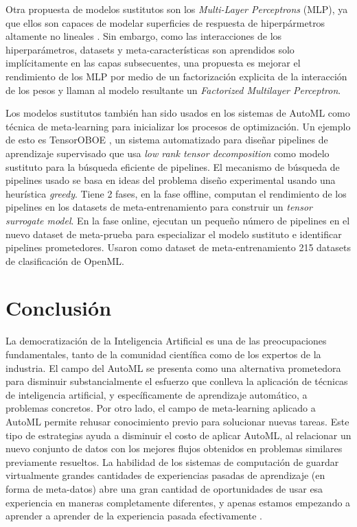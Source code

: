 Otra propuesta de modelos sustitutos son los \textit{Multi-Layer Perceptrons} (MLP), ya que ellos son capaces de modelar superficies de respuesta de hiperpármetros altamente no lineales \cite{schilling2015hyp}. Sin embargo, como las interacciones de los hiperparámetros, datasets y meta-características son aprendidos solo implícitamente en las capas subsecuentes, una propuesta es mejorar el rendimiento de los MLP por medio de un factorización explicita de la interacción de los pesos y llaman al modelo resultante un \textit{Factorized Multilayer Perceptron}.

Los modelos sustitutos también han sido usados en los sistemas de AutoML como técnica de meta-learning para inicializar los procesos de optimización. Un ejemplo de esto es TensorOBOE \cite{yang2020automl}, un sistema automatizado para diseñar pipelines de aprendizaje supervisado que usa \textit{low rank tensor decomposition} como modelo sustituto para la búsqueda eficiente de pipelines. El mecanismo de búsqueda de pipelines usado se basa en ideas del problema diseño experimental \cite{borkowski1994optimal, makar2011teaching} usando una heurística \textit{greedy}. Tiene 2 fases, en la fase offline, computan el rendimiento de los pipelines en los datasets de meta-entrenamiento para construir un \textit{tensor surrogate model}. En la fase online, ejecutan un pequeño número de pipelines en el nuevo dataset de meta-prueba para especializar el modelo sustituto e identificar pipelines prometedores. Usaron como dataset de meta-entrenamiento 215 datasets de clasificación de OpenML.


\section{Conclusión}\label{sec:conclusion}

La democratización de la Inteligencia Artificial es una de las preocupaciones fundamentales, tanto de la comunidad científica como de los expertos de la industria. El campo del AutoML se presenta como una alternativa prometedora para disminuir substancialmente el esfuerzo que conlleva la aplicación de técnicas de inteligencia artificial, y específicamente de aprendizaje automático, a problemas concretos. Por otro lado, el campo de meta-learning aplicado a AutoML permite rehusar conocimiento previo para solucionar nuevas tareas. Este tipo de estrategias ayuda a disminuir el costo de aplicar AutoML, al relacionar un nuevo conjunto de datos con los mejores flujos obtenidos en problemas similares previamente resueltos. La habilidad de los sistemas de computación de guardar virtualmente grandes cantidades de experiencias pasadas de aprendizaje (en forma de meta-datos) abre una gran cantidad de oportunidades de usar esa experiencia en maneras completamente diferentes, y apenas estamos empezando a aprender a aprender de la experiencia pasada efectivamente \cite{vanschoren2018metalearning}.

